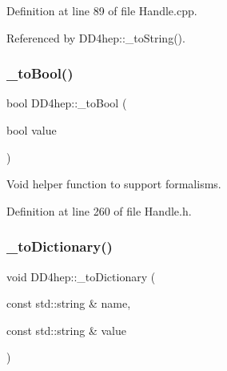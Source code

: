 Definition at line 89 of file Handle.\+cpp.



Referenced by D\+D4hep\+::\+\_\+to\+String().

\hypertarget{group___d_d4_h_e_p___g_e_o_m_e_t_r_y_ga26bde74c72a880a8a0daa324cc82d423}{}\label{group___d_d4_h_e_p___g_e_o_m_e_t_r_y_ga26bde74c72a880a8a0daa324cc82d423} 
\subsubsection{\texorpdfstring{\+\_\+to\+Bool()}{\_toBool()}\hspace{0.1cm}{\footnotesize\ttfamily [2/2]}}
{\footnotesize\ttfamily bool D\+D4hep\+::\+\_\+to\+Bool (\begin{DoxyParamCaption}\item[{bool}]{value }\end{DoxyParamCaption})\hspace{0.3cm}{\ttfamily [inline]}}



Void helper function to support formalisms. 



Definition at line 260 of file Handle.\+h.

\hypertarget{group___d_d4_h_e_p___g_e_o_m_e_t_r_y_gaaf303de968d2679957961df3928767c1}{}\label{group___d_d4_h_e_p___g_e_o_m_e_t_r_y_gaaf303de968d2679957961df3928767c1} 
\subsubsection{\texorpdfstring{\+\_\+to\+Dictionary()}{\_toDictionary()}\hspace{0.1cm}{\footnotesize\ttfamily [1/2]}}
{\footnotesize\ttfamily void D\+D4hep\+::\+\_\+to\+Dictionary (\begin{DoxyParamCaption}\item[{const std\+::string \&}]{name,  }\item[{const std\+::string \&}]{value }\end{DoxyParamCaption})}



